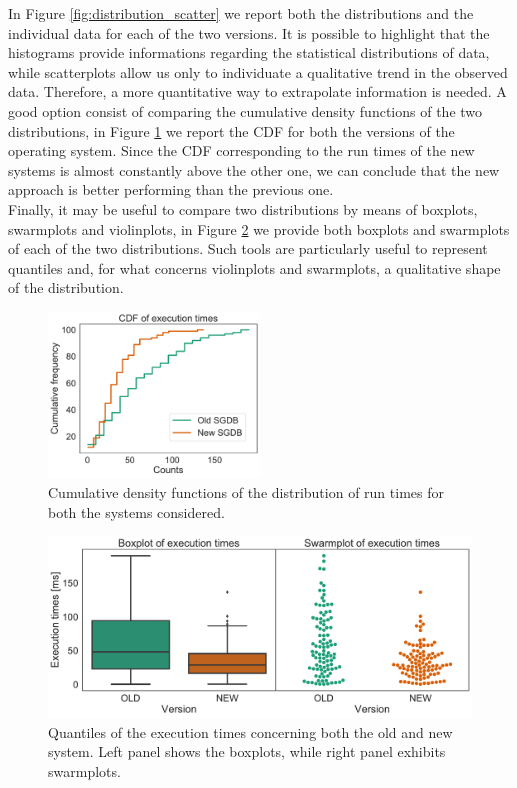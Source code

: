 \documentclass[twoside,onecolumn]{article}
\theoremstyle{definition}
\begin{document}
 \par
In Figure \ref{fig:distribution_scatter} we report both the distributions and the individual data for each of the two versions. It is possible to highlight that the histograms provide informations regarding the statistical distributions of data, while scatterplots allow us only to individuate a qualitative trend in the observed data. Therefore, a more quantitative way to extrapolate information is needed. A good option consist of comparing the cumulative density functions of the two distributions, in Figure \ref{fig:cdf} we report the CDF for both the versions of the operating system. Since the CDF corresponding to the run times of the new systems is almost constantly above the other one, we can conclude that the new approach is better performing than the previous one.\\Finally, it may be useful to compare two distributions by means of boxplots, swarmplots and violinplots, in Figure \ref{fig:boxswarm} we provide both boxplots and swarmplots of each of the two distributions. Such tools are particularly useful to represent quantiles and, for what concerns violinplots and swarmplots, a qualitative shape of the distribution.


\begin{figure}\centering
\includegraphics[width=0.5\textwidth]{../figs/extimes_CDF.pdf}
\caption{Cumulative density functions of the distribution of run times for both the systems considered. }\label{fig:cdf}
\end{figure}

\begin{figure}\centering
\includegraphics[width=0.9
\textwidth]{../figs/extimes_quantiles.pdf}
\caption{Quantiles of the execution times concerning both the old and new system. Left panel shows the boxplots, while right panel exhibits swarmplots.}\label{fig:boxswarm}
\end{figure}
\end{document}

